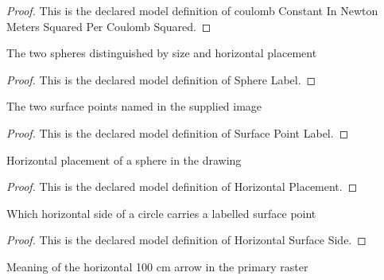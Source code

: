 \begin{proof}
  This is the declared model definition of coulomb Constant In Newton Meters Squared Per Coulomb Squared.
\end{proof}
\begin{definition}
  \label{def:physics:phyx-mini-0867:phyxminiproblems-problemphyxmini0867-spherelabel}
  The two spheres distinguished by size and horizontal placement
\end{definition}
\begin{proof}
  This is the declared model definition of Sphere Label.
\end{proof}
\begin{definition}
  \label{def:physics:phyx-mini-0867:phyxminiproblems-problemphyxmini0867-surfacepointlabel}
  The two surface points named in the supplied image
\end{definition}
\begin{proof}
  This is the declared model definition of Surface Point Label.
\end{proof}
\begin{definition}
  \label{def:physics:phyx-mini-0867:phyxminiproblems-problemphyxmini0867-horizontalplacement}
  Horizontal placement of a sphere in the drawing
\end{definition}
\begin{proof}
  This is the declared model definition of Horizontal Placement.
\end{proof}
\begin{definition}
  \label{def:physics:phyx-mini-0867:phyxminiproblems-problemphyxmini0867-horizontalsurfaceside}
  Which horizontal side of a circle carries a labelled surface point
\end{definition}
\begin{proof}
  This is the declared model definition of Horizontal Surface Side.
\end{proof}
\begin{definition}
  \label{def:physics:phyx-mini-0867:phyxminiproblems-problemphyxmini0867-separationarrowrole}
  Meaning of the horizontal 100 cm arrow in the primary raster
\end{definition}
